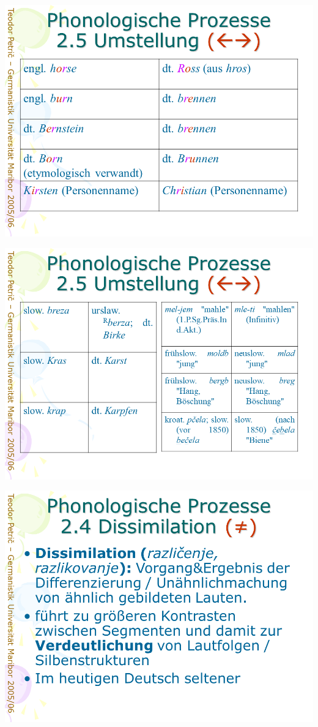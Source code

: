 \documentclass[
  letterpaper,
]{scrbook}
\begin{document}
\includegraphics[width=1\textwidth,height=\textheight]{./pictures/prozesse/prozesse_18.PNG}

\includegraphics[width=1\textwidth,height=\textheight]{./pictures/prozesse/prozesse_19.PNG}

\includegraphics[width=1\textwidth,height=\textheight]{./pictures/prozesse/prozesse_20.PNG}
\end{document}
